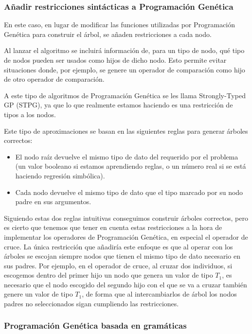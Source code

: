 \subsubsection{Añadir restricciones sintácticas a Programación Genética}

En este caso, en lugar de modificar las funciones utilizadas por Programación Genética para construir el árbol, se añaden restricciones a cada nodo.

Al lanzar el algoritmo se incluirá información de, para un tipo de nodo, qué tipo de nodos pueden ser usados como hijos de dicho nodo. Esto permite evitar situaciones donde, por ejemplo, se genere un operador de comparación como hijo de otro operador de comparación.

A este tipo de algoritmos de Programación Genética se les llama Strongly-Typed GP (STPG), ya que lo que realmente estamos haciendo es una restricción de tipos a los nodos.

Este tipo de aproximaciones se basan en las siguientes reglas para generar árboles correctos:

\begin{itemize}
	\item El nodo raíz devuelve el mismo tipo de dato del requerido por el problema (un valor booleano si estamos aprendiendo reglas, o un número real si se está haciendo regresión simbólica).
	\item Cada nodo devuelve el mismo tipo de dato que el tipo marcado por su nodo padre en sus argumentos.
\end{itemize}

Siguiendo estas dos reglas intuitivas conseguimos construir árboles correctos, pero es cierto que tenemos que tener en cuenta estas restricciones a la hora de implementar los operadores de Programación Genética, en especial el operador de cruce. La única restricción que añadiría este enfoque es que al operar con los árboles se escojan siempre nodos que tienen el mismo tipo de dato necesario en sus padres. Por ejemplo, en el operador de cruce, al cruzar dos individuos, si escogemos dentro del primer hijo un nodo que genera un valor de tipo $T_1$, es necesario que el nodo escogido del segundo hijo con el que se va a cruzar también genere un valor de tipo $T_1$, de forma que al intercambiarlos de árbol los nodos padres no seleccionados sigan cumpliendo las restricciones.


\subsubsection{Programación Genética basada en gramáticas}

